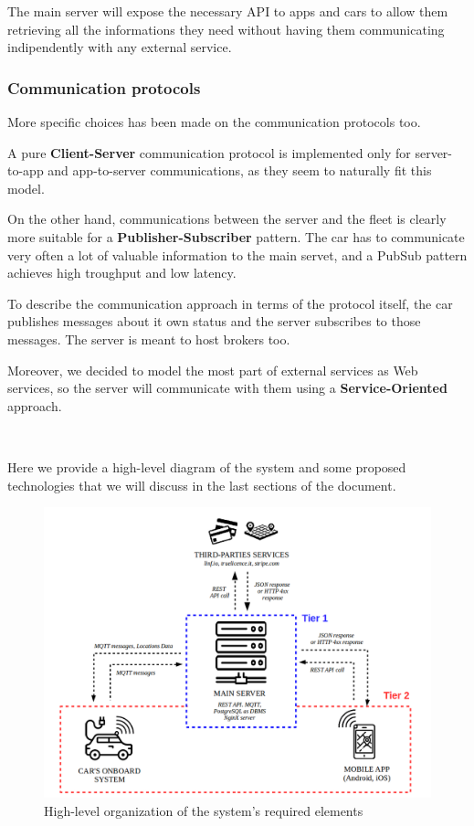 \documentclass[11pt]{article} %
\begin{document}
The main server will expose the necessary API to apps and cars to allow them retrieving all the informations they need without having them communicating indipendently with any external service.

\subsubsection{Communication protocols}
More specific choices has been made on the communication protocols too.

A pure \textbf{Client-Server} communication protocol is implemented only for server-to-app and app-to-server communications, as they seem to naturally fit this model.

On the other hand, communications between the server and the fleet is clearly more suitable for a \textbf{Publisher-Subscriber} pattern. The car has to communicate very often a lot of valuable information to the main servet, and a PubSub pattern achieves high troughput and low latency.
 
To describe the communication approach in terms of the protocol itself, the car publishes messages about it own status and the server subscribes to those messages. The server is meant to host brokers too.

Moreover, we decided to model the most part of external services as Web services, so the server will communicate with them using a \textbf{Service-Oriented} approach.

\hfill\

Here we provide a high-level diagram of the system and some proposed technologies that we will discuss in the last sections of  the document.


\begin{figure}[H]
	\centering
	\includegraphics[width=1\textwidth]{proposed_system.png}
	\caption{High-level organization of the system's required elements}
\end{figure}
\end{document}
